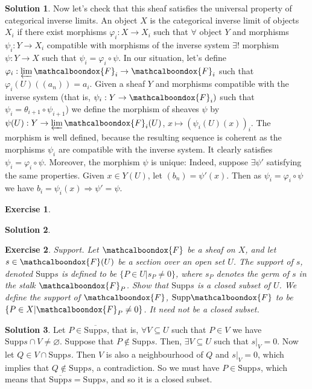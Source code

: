 \documentclass[12pt]{article}
\newcommand{\imp}{\ensuremath{\Rightarrow}}
\newtheorem{ex}{Exercise}[section]
\theoremstyle{definition}
\newtheorem*{sol}{Solution}
\newcommand{\sF}{\ensuremath{\mathcalboondox{F}}}
\begin{document}
\begin{sol}
	Now let's check that this sheaf satisfies the universal property of categorical inverse limits. An object $X$ is the categorical inverse limit of objects $X_i$ if there exist morphisms $\varphi_i: X \to X_i$ such that $\forall$ object $Y$ and morphisms $\psi_i: Y \to X_i$ compatible with morphisms of the inverse system $\exists !$ morphism $\psi: Y \to X$ such that $\psi_i = \varphi_i \circ \psi$. In our situation, let's define $\varphi_i: \varprojlim \sF_i \to \sF_i$ such that $\varphi_i(U)((a_n)) = a_i$. Given a sheaf $Y$ and morphisms compatible with the inverse system (that is, $\psi_i: Y \to \sF_i)$ such that $\psi_i = \theta_{i+1} \circ \psi_{i+1}$) we define the morphism of sheaves $\psi$ by $\psi(U): Y \to \varprojlim \sF_i(U)$, $x \mapsto (\psi_i(U)(x))_i$. The morphism is well defined, because the resulting sequence is coherent as the morphisms $\psi_i$ are compatible with the inverse system. It clearly satisfies $\psi_i = \varphi_i \circ \psi$. Moreover, the morphism $\psi$ is unique: Indeed, suppose $\exists \psi'$ satisfying the same properties. Given $x \in Y(U)$, let $(b_n) = \psi'(x)$. Then as $\psi_i = \varphi_i \circ \psi$ we have $b_i = \psi_i(x) \imp \psi' = \psi$. 
\end{sol}

\begin{ex}

\end{ex}

\begin{sol}
\end{sol}

\begin{ex}
	Support. Let $\sF$ be a sheaf on $X$, and let $s \in \sF(U)$ be a section over an open set $U$. The support of $s$, denoted $\mathrm{Supp} s$ is defined to be $\{P \in U |s_P \neq 0\}$, where $s_P$ denotes the germ of $s$ in the stalk $\sF_P$. Show that $\mathrm{Supp} s$ is a closed subset of $U$. We define the support of $\sF$, $\mathrm{Supp} \sF$ to be $\{P \in X | \sF_P \neq 0\}$. It need not be a closed subset.
\end{ex}

\begin{sol}
	Let $P \in \overline{\mathrm{Supp} s}$, that is, $\forall V \subseteq U$ such that $P \in V$ we have $\mathrm{Supp} s \cap V \neq \varnothing$. Suppose that $P \notin \mathrm{Supp} s$. Then, $\exists V \subseteq U$ such that $s|_V = 0$. Now let $Q \in V \cap \mathrm{Supp} s$. Then $V$ is also a neighbourhood of $Q$ and $s|_V = 0$, which implies that $Q \notin \mathrm{Supp} s$, a contradiction. So we must have $P \in \mathrm{Supp} s$, which means that $\overline{\mathrm{Supp} s} = \mathrm{Supp} s$, and so it is a closed subset. 
\end{sol}
\end{document}

